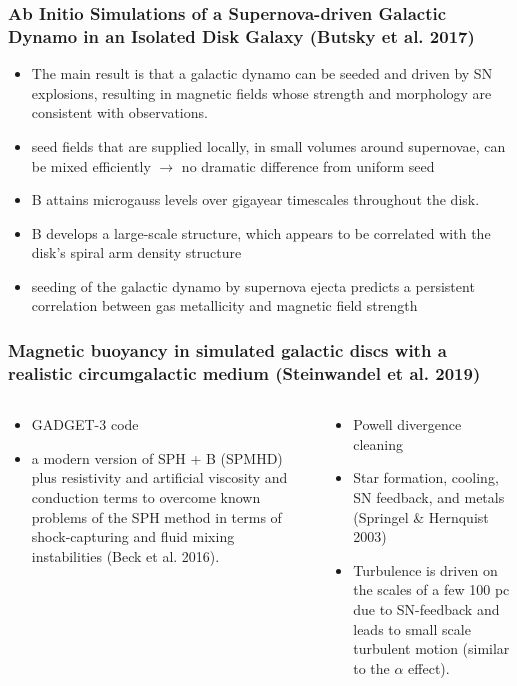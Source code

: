 \documentclass[10pt,aspectratio=169]{beamer}
\begin{document}
\begin{frame}
	\frametitle{Ab Initio Simulations of a Supernova-driven Galactic Dynamo in an Isolated Disk Galaxy (Butsky et al. 2017)}
	\begin{itemize}
		\item The main result is that a galactic dynamo can be seeded and driven by SN explosions, resulting in magnetic fields whose strength and morphology are consistent with observations.
		\item seed fields that are supplied locally, in small volumes around supernovae, can be mixed efficiently $\rightarrow$ no dramatic difference from uniform seed
		\item B attains microgauss levels over gigayear timescales throughout the disk.
		\item B develops a large-scale structure, which appears to be correlated with the disk’s spiral arm density structure
		\item seeding of the galactic dynamo by supernova ejecta predicts a persistent correlation between gas metallicity and magnetic field strength
	\end{itemize}
\end{frame}
\begin{frame}
	\frametitle{Magnetic buoyancy in simulated galactic discs with a realistic circumgalactic medium (Steinwandel et al. 2019)}
		\begin{columns}
			\begin{column}{0.48\textwidth}
				\begin{itemize}
					\item GADGET-3 code
					\item a modern version of SPH + B (SPMHD) plus resistivity and artificial viscosity and conduction terms to overcome known problems of the SPH method in terms of shock-capturing and fluid mixing instabilities (Beck et al. 2016).
				\end{itemize}
			\end{column}
			\begin{column}{0.48\textwidth}
					\begin{itemize}
						\item Powell divergence cleaning
						\item Star formation, cooling, SN feedback, and metals (Springel \& Hernquist 2003)
						\item Turbulence is driven on the scales of a few 100 pc due to SN-feedback and leads to small scale turbulent motion (similar to the $\alpha$ effect).
					\end{itemize}
			\end{column}
		\end{columns}
\end{frame}
\end{document}
